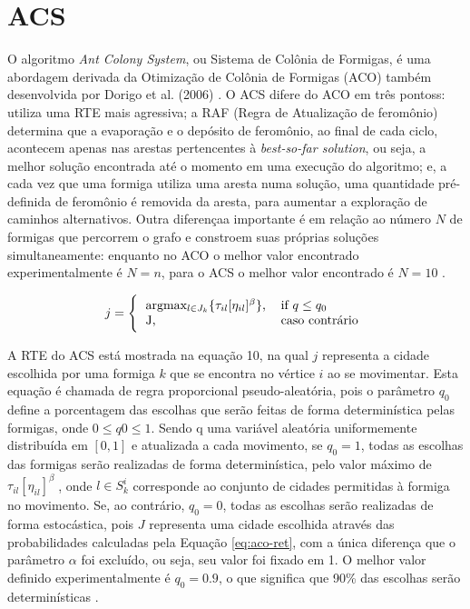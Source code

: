 \section{ACS}
\label{sec-acs}

O algoritmo \textit{Ant Colony System}, ou Sistema de Colônia de Formigas, é  uma abordagem derivada da Otimização de Colônia de Formigas (ACO) também desenvolvida por Dorigo et al. (2006) \cite{dorigo2008particle}. O ACS difere do ACO em três pontoss: utiliza uma RTE mais agressiva; a RAF (Regra de Atualização de feromônio) determina que a evaporação e o depósito de feromônio, ao final de cada ciclo, acontecem apenas nas arestas pertencentes à \textit{best-so-far solution}, ou seja, a melhor solução encontrada até o momento em uma execução do algoritmo; e, a cada vez que uma formiga utiliza uma aresta numa solução, uma quantidade pré-definida de feromônio é removida da aresta, para aumentar a exploração de caminhos alternativos. Outra diferençaa importante é em relação ao número $N$ de formigas que percorrem o grafo e constroem suas próprias soluções simultaneamente: enquanto no ACO o melhor valor encontrado experimentalmente é $N = n$, para o ACS o melhor valor encontrado é $N = 10$ \cite{dorigo2008particle}.

\begin{equation} \label{eq:acs-ret} 
    j = \Bigg\{
        \begin{tabular}{ll}
        argmax\(_{l \in J_k} \{\tau_{il}[\eta_{il}]^\beta\}\), & if $q \leq q_0$ \\
        J, & caso contrário
        \end{tabular}
\end{equation}

A RTE do ACS está mostrada na equação 10, na qual $j$ representa a cidade escolhida por uma formiga $k$ que se encontra
no vértice $i$ ao se movimentar. Esta equação é chamada de regra proporcional pseudo-aleatória, pois o parâmetro $q_0$ define a porcentagem das escolhas que serão feitas de forma determinística pelas formigas, onde $0 \leq q0 \leq 1$. Sendo q uma variável aleatória uniformemente distribuída em $[0, 1]$ e atualizada a cada movimento, se $q_0 = 1$, todas as escolhas das formigas serão realizadas de forma determinística, pelo valor máximo de $\tau_{il}[\eta_{il}]^\beta$, onde $l \in S_k^i$ corresponde ao conjunto de cidades permitidas à formiga no movimento. Se, ao contrário, $q_0 = 0$, todas as escolhas serão realizadas de forma estocástica, pois $J$ representa uma cidade escolhida através das probabilidades calculadas pela Equação \ref{eq:aco-ret}, com a única diferença que o parâmetro $\alpha$ foi excluído, ou seja, seu valor foi fixado em 1. O melhor valor definido experimentalmente é $q_0 = 0.9$, o que significa que 90\% das escolhas serão determinísticas \cite{dorigo2008particle}.

